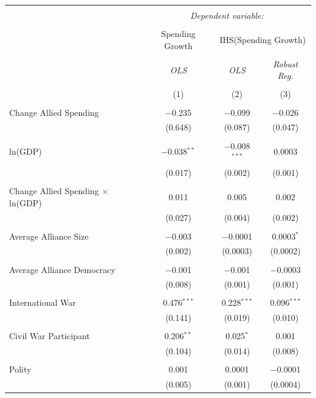 \documentclass[12pt]{article}
\begin{document}
\begin{table}[!htbp] \centering 
\begin{tabular}{@{\extracolsep{5pt}}lccc} 
\\[-1.8ex]\hline 
\hline \\[-1.8ex] 
 & \multicolumn{3}{c}{\textit{Dependent variable:}} \\ 
\cline{2-4} 
\\[-1.8ex] & Spending Growth & \multicolumn{2}{c}{IHS(Spending Growth)} \\ 
\\[-1.8ex] & \textit{OLS} & \textit{OLS} & \textit{Robust Reg.} \\ 
\\[-1.8ex] & (1) & (2) & (3)\\ 
\hline \\[-1.8ex] 
 Change Allied Spending & $-$0.235 & $-$0.099 & $-$0.026 \\ 
  & (0.648) & (0.087) & (0.047) \\ 
  & & & \\ 
 ln(GDP) & $-$0.038$^{**}$ & $-$0.008$^{***}$ & 0.0003 \\ 
  & (0.017) & (0.002) & (0.001) \\ 
  & & & \\ 
 Change Allied Spending $\times$ ln(GDP) & 0.011 & 0.005 & 0.002 \\ 
  & (0.027) & (0.004) & (0.002) \\ 
  & & & \\ 	
 Average Alliance Size & $-$0.003 & $-$0.0001 & 0.0003$^{*}$ \\ 
  & (0.002) & (0.0003) & (0.0002) \\ 
  & & & \\ 
 Average Alliance Democracy & $-$0.001 & $-$0.001 & $-$0.0003 \\ 
  & (0.008) & (0.001) & (0.001) \\ 
  & & & \\ 
 International War & 0.476$^{***}$ & 0.228$^{***}$ & 0.096$^{***}$ \\ 
  & (0.141) & (0.019) & (0.010) \\ 
  & & & \\ 
 Civil War Participant & 0.206$^{**}$ & 0.025$^{*}$ & 0.001 \\ 
  & (0.104) & (0.014) & (0.008) \\ 
  & & & \\ 
 Polity & 0.001 & 0.0001 & $-$0.0001 \\ 
  & (0.005) & (0.001) & (0.0004) \\ 

\end{tabular}
\end{table}
\end{document}
